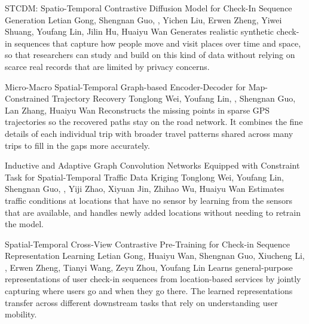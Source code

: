 {STCDM: Spatio-Temporal Contrastive Diffusion Model for Check-In Sequence Generation}
{Letian Gong, Shengnan Guo, \me, Yichen Liu, Erwen Zheng, Yiwei Shuang, Youfang Lin, Jilin Hu, Huaiyu Wan}
{Generates realistic synthetic check-in sequences that capture how people move and visit places over time and space, so that researchers can study and build on this kind of data without relying on scarce real records that are limited by privacy concerns.}

{Micro-Macro Spatial-Temporal Graph-based Encoder-Decoder for Map-Constrained Trajectory Recovery}
{Tonglong Wei, Youfang Lin, \me, Shengnan Guo, Lan Zhang, Huaiyu Wan}
{Reconstructs the missing points in sparse GPS trajectories so the recovered paths stay on the road network. It combines the fine details of each individual trip with broader travel patterns shared across many trips to fill in the gaps more accurately.}

{Inductive and Adaptive Graph Convolution Networks Equipped with Constraint Task for Spatial-Temporal Traffic Data Kriging}
{Tonglong Wei, Youfang Lin, Shengnan Guo, \me, Yiji Zhao, Xiyuan Jin, Zhihao Wu, Huaiyu Wan}
{Estimates traffic conditions at locations that have no sensor by learning from the sensors that are available, and handles newly added locations without needing to retrain the model.}

{Spatial-Temporal Cross-View Contrastive Pre-Training for Check-in Sequence Representation Learning}
{Letian Gong, Huaiyu Wan, Shengnan Guo, Xiucheng Li, \me, Erwen Zheng, Tianyi Wang, Zeyu Zhou, Youfang Lin}
{Learns general-purpose representations of user check-in sequences from location-based services by jointly capturing where users go and when they go there. The learned representations transfer across different downstream tasks that rely on understanding user mobility.}

